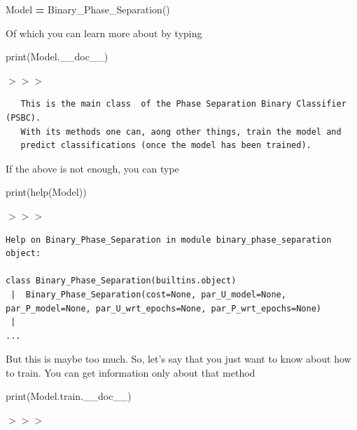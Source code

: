 \documentclass[openany,twoside]{book}
\newenvironment{Shaded}{\begin{snugshade}}{\end{snugshade}}
\newcommand{\BuiltInTok}[1]{#1}
\newcommand{\NormalTok}[1]{#1}
\newcommand{\OperatorTok}[1]{\textcolor[rgb]{0.81,0.36,0.00}{\textbf{#1}}}
\begin{document}
\begin{Shaded}
\begin{Highlighting}[]
\NormalTok{Model }\OperatorTok{=}\NormalTok{ Binary_Phase_Separation()}
\end{Highlighting}
\end{Shaded}

Of which you can learn more about by typing

\begin{Shaded}
\begin{Highlighting}[]
\BuiltInTok{print}\NormalTok{(Model.__doc__)}
\end{Highlighting}
\end{Shaded}

\(>>>\)

\begin{verbatim}
   This is the main class  of the Phase Separation Binary Classifier (PSBC).
   With its methods one can, aong other things, train the model and 
   predict classifications (once the model has been trained).
\end{verbatim}

If the above is not enough, you can type

\begin{Shaded}
\begin{Highlighting}[]
\BuiltInTok{print}\NormalTok{(}\BuiltInTok{help}\NormalTok{(Model))}
\end{Highlighting}
\end{Shaded}

\(>>>\)

\begin{verbatim}
Help on Binary_Phase_Separation in module binary_phase_separation object:

class Binary_Phase_Separation(builtins.object)
 |  Binary_Phase_Separation(cost=None, par_U_model=None, par_P_model=None, par_U_wrt_epochs=None, par_P_wrt_epochs=None)
 |  
...
\end{verbatim}

But this is maybe too much. So, let's say that you just want to know about how to train. You can get information only about that method

\begin{Shaded}
\begin{Highlighting}[]
\BuiltInTok{print}\NormalTok{(Model.train.__doc__)}
\end{Highlighting}
\end{Shaded}

\(>>>\)
\end{document}
